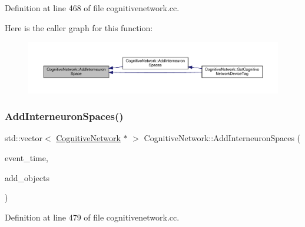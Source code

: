 Definition at line 468 of file cognitivenetwork.\+cc.

Here is the caller graph for this function\+:
\nopagebreak
\begin{figure}[H]
\begin{center}
\leavevmode
\includegraphics[width=350pt]{class_cognitive_network_ac6a7e01f097d0cb6434eb8fa7640c214_icgraph}
\end{center}
\end{figure}
\mbox{\label{class_cognitive_network_aeafe16b9f44ae1316c072a85e726ee83}} 
\subsubsection{\texorpdfstring{Add\+Interneuron\+Spaces()}{AddInterneuronSpaces()}}
{\footnotesize\ttfamily std\+::vector$<$ \hyperlink{class_cognitive_network}{Cognitive\+Network} $\ast$ $>$ Cognitive\+Network\+::\+Add\+Interneuron\+Spaces (\begin{DoxyParamCaption}\item[{std\+::chrono\+::time\+\_\+point$<$ \hyperlink{universe_8h_a0ef8d951d1ca5ab3cfaf7ab4c7a6fd80}{Clock} $>$}]{event\+\_\+time,  }\item[{std\+::vector$<$ \hyperlink{class_cognitive_network}{Cognitive\+Network} $\ast$$>$}]{add\+\_\+objects }\end{DoxyParamCaption})}



Definition at line 479 of file cognitivenetwork.\+cc.

